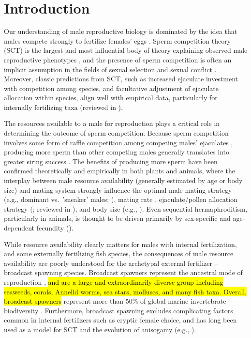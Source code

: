 \documentclass{article}
\begin{document}
\newpage


\section{Introduction}

Our understanding of male reproductive biology is dominated by the idea that males compete strongly to fertilize females' eggs \citep{Bateman1948, Parker1972, Parker1982}. Sperm competition theory (SCT) is the largest and most influential body of theory explaining observed male reproductive phenotypes \citep{Parker1972, Parker1982,Wedell2002}, and the presence of sperm competition is often an implicit assumption in the fields of sexual selection and sexual conflict \citep{BirkheadMoller1998, ArnqvistRowe2005}. Moreover, classic predictions from SCT, such as increased ejaculate investment with competition among species, and facultative adjustment of ejaculate allocation within species, align well with empirical data, particularly for internally fertilizing taxa (reviewed in \citealt{Wedell2002}). 

The resources available to a male for reproduction plays a critical role in determining the outcome of sperm competition. Because sperm competition involves some form of raffle competition among competing males' ejaculates \citep{Wedell2002, ArnqvistRowe2005}, producing more sperm than other competing males generally translates into greater siring success \citep{Parker1972, Parker1982, Wedell2002}. The benefits of producing more sperm have been confirmed theoretically and empirically in both plants and animals, where the interplay between male resource availability (generally estimated by age or body size) and mating system strongly influence the optimal male mating strategy (e.g., dominant vs.~'sneaker' males; \citealt{Parker1990a,Parker1990b,GageEtAl1995}), mating rate \citep{Parker1990b, BirkheadMoller1998, Wedell2002}, ejaculate/pollen allocation strategy (\citealt{FriedmanBarrett2009}; reviewed in \citealt{Wedell2002, Zhang2006}), and body size (e.g., \citealt{ArnoldWade1984}). Even sequential hermaphroditism, particularly in animals, is thought to be driven primarily by sex-specific and age-dependent fecundity (\citealt{Ghiselin1969, Warner1975, Warner1988, MundayWarner2006}).

While resource availability clearly matters for males with internal fertilization, and some externally fertilizing fish species, the consequences of male resource availability are poorly understood for the archetypal external fertilizer -- broadcast spawning species. Broadcast spawners represent the ancestral mode of reproduction \citep{RouFitz1994}, \hl{and are a large and extraordinarily diverse group including seaweeds, corals, Annelid worms, sea stars, molluscs, and many fish taxa. Overall, broadcast spawners} represent more than 50\% of global marine invertebrate biodiversity \citep{MonroMarshall2015}. Furthermore, broadcast spawning excludes complicating factors common in internal fertilizers such as cryptic female choice, and has long been used as a model for SCT and the evolution of anisogamy (e.g., \citealt{Parker1972, Parker1982,Parker2017}). 
\end{document}
